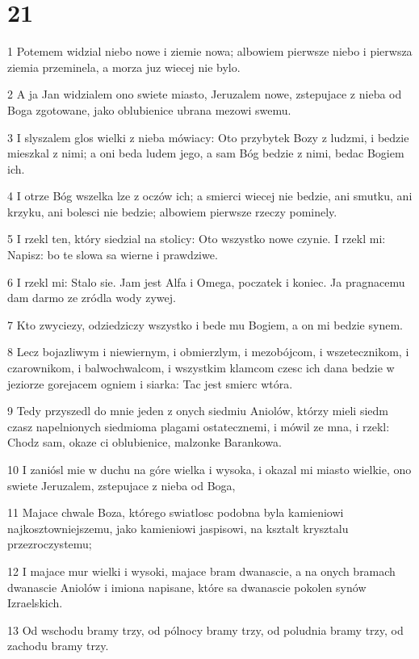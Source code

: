 \chapter{21}

\par 1 Potemem widzial niebo nowe i ziemie nowa; albowiem pierwsze niebo i pierwsza ziemia przeminela, a morza juz wiecej nie bylo.
\par 2 A ja Jan widzialem ono swiete miasto, Jeruzalem nowe, zstepujace z nieba od Boga zgotowane, jako oblubienice ubrana mezowi swemu.
\par 3 I slyszalem glos wielki z nieba mówiacy: Oto przybytek Bozy z ludzmi, i bedzie mieszkal z nimi; a oni beda ludem jego, a sam Bóg bedzie z nimi, bedac Bogiem ich.
\par 4 I otrze Bóg wszelka lze z oczów ich; a smierci wiecej nie bedzie, ani smutku, ani krzyku, ani bolesci nie bedzie; albowiem pierwsze rzeczy pominely.
\par 5 I rzekl ten, który siedzial na stolicy: Oto wszystko nowe czynie. I rzekl mi: Napisz: bo te slowa sa wierne i prawdziwe.
\par 6 I rzekl mi: Stalo sie. Jam jest Alfa i Omega, poczatek i koniec. Ja pragnacemu dam darmo ze zródla wody zywej.
\par 7 Kto zwyciezy, odziedziczy wszystko i bede mu Bogiem, a on mi bedzie synem.
\par 8 Lecz bojazliwym i niewiernym, i obmierzlym, i mezobójcom, i wszetecznikom, i czarownikom, i balwochwalcom, i wszystkim klamcom czesc ich dana bedzie w jeziorze gorejacem ogniem i siarka: Tac jest smierc wtóra.
\par 9 Tedy przyszedl do mnie jeden z onych siedmiu Aniolów, którzy mieli siedm czasz napelnionych siedmioma plagami ostatecznemi, i mówil ze mna, i rzekl: Chodz sam, okaze ci oblubienice, malzonke Barankowa.
\par 10 I zaniósl mie w duchu na góre wielka i wysoka, i okazal mi miasto wielkie, ono swiete Jeruzalem, zstepujace z nieba od Boga,
\par 11 Majace chwale Boza, którego swiatlosc podobna byla kamieniowi najkosztowniejszemu, jako kamieniowi jaspisowi, na ksztalt krysztalu przezroczystemu;
\par 12 I majace mur wielki i wysoki, majace bram dwanascie, a na onych bramach dwanascie Aniolów i imiona napisane, które sa dwanascie pokolen synów Izraelskich.
\par 13 Od wschodu bramy trzy, od pólnocy bramy trzy, od poludnia bramy trzy, od zachodu bramy trzy.
